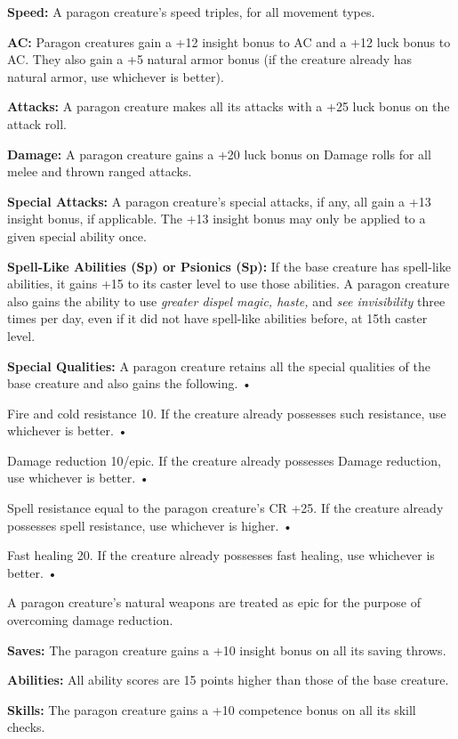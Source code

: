 \documentclass{article}
\begin{document}
{\textbf{Speed:} A paragon creature's speed triples, for all movement types. 

\textbf{AC:} Paragon creatures gain a +12 insight bonus to AC and a +12 luck bonus 
to AC. They also gain a +5 natural armor bonus (if the creature already has natural 
armor, use whichever is better). 

\textbf{Attacks:} A paragon creature makes all its attacks with a +25 luck bonus 
on the attack roll. 

\textbf{Damage:} A paragon creature gains a +20 luck bonus on Damage rolls for 
all melee and thrown ranged attacks. 

\textbf{Special Attacks:} A paragon creature's special attacks, if any, all gain 
a +13 insight bonus, if applicable. The +13 insight bonus may only be applied to 
a given special ability once. 

\textbf{Spell-Like Abilities (Sp) or Psionics (Sp):} If the base creature has spell-like 
abilities, it gains +15 to its caster level to use those abilities. A paragon creature 
also gains the ability to use \textit{greater dispel magic, haste, }and \textit{see 
invisibility }three times per day, even if it did not have spell-like abilities 
before, at 15th caster level. 

\textbf{Special Qualities:} A paragon creature retains all the special qualities 
of the base creature and also gains the following. • 

\parindent=3pt
Fire and cold resistance 10. If the creature already possesses such resistance, 
use whichever is better. • 

Damage reduction 10/epic. If the creature already possesses Damage reduction, use 
whichever is better. • 

Spell resistance equal to the paragon creature's CR +25. If the creature already 
possesses spell resistance, use whichever is higher. • 

Fast healing 20. If the creature already possesses fast healing, use whichever 
is better. • 

\parindent=7pt
A paragon creature's natural weapons are treated as epic for the purpose of overcoming 
damage reduction.

\parindent=0pt
\textbf{Saves:} The paragon creature gains a +10 insight bonus on all its saving 
throws. 

\textbf{Abilities:} All ability scores are 15 points higher than those of the base 
creature. 

\textbf{Skills:} The paragon creature gains a +10 competence bonus on all its skill 
checks. 

}
\end{document}
